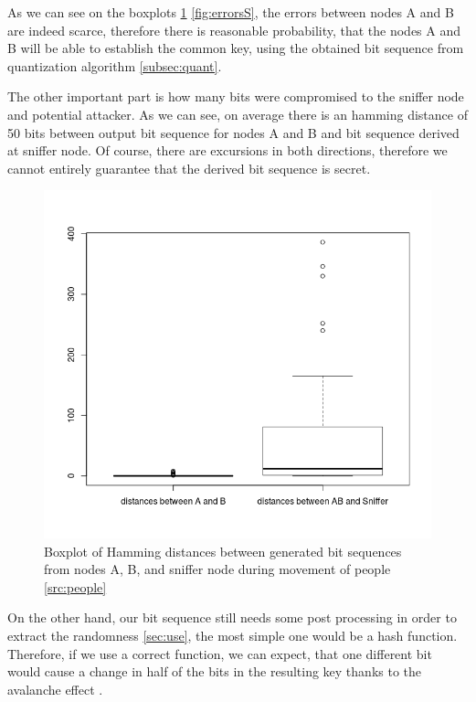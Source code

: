 \documentclass[
  print, %
  Table,   %
  nolof,     %
  nolot,     %
           oneside
]{fithesis3}
\begin{document}
  As we can see on the boxplots \ref{fig:errorsT} \ref{fig:errorsS}, the errors between nodes A and B are indeed scarce, therefore there is reasonable probability, that the nodes A and B will be able to establish the common key, using the obtained bit sequence from quantization algorithm \ref{subsec:quant}.

  The other important part is how many bits were compromised to the sniffer node and potential attacker. As we can see, on average there is an hamming distance of 50 bits between output bit sequence for nodes A and B and bit sequence derived at sniffer node. Of course, there are excursions in both directions, therefore we cannot entirely guarantee that the derived bit sequence is secret.


  \begin{figure}
    \includegraphics[width=\textwidth]{../images/boxplotDistancesTeaching.png}
  \caption{Boxplot of Hamming distances between generated bit sequences from nodes A, B, and sniffer node during movement of people \ref{src:people}}
  \label{fig:errorsT}
  \end{figure}

On the other hand, our bit sequence still needs some post processing in order to extract the randomness \ref{sec:use}, the most simple one would be a hash function. Therefore, if we use a correct function, we can expect, that one different bit would cause a change in half of the bits in the resulting key thanks to the avalanche effect \cite{Webster1986}.
\end{document}
